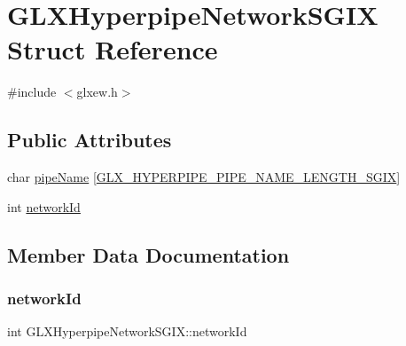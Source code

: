 \hypertarget{struct_g_l_x_hyperpipe_network_s_g_i_x}{}\section{G\+L\+X\+Hyperpipe\+Network\+S\+G\+IX Struct Reference}
\label{struct_g_l_x_hyperpipe_network_s_g_i_x}


{\ttfamily \#include $<$glxew.\+h$>$}

\subsection*{Public Attributes}
\begin{DoxyCompactItemize}
\item 
char \hyperlink{struct_g_l_x_hyperpipe_network_s_g_i_x_a6338b9717fa895aec16b932f2ef693ed}{pipe\+Name} \mbox{[}\hyperlink{glxew_8h_ae1c8261c0861010d8003a31d07e26005}{G\+L\+X\+\_\+\+H\+Y\+P\+E\+R\+P\+I\+P\+E\+\_\+\+P\+I\+P\+E\+\_\+\+N\+A\+M\+E\+\_\+\+L\+E\+N\+G\+T\+H\+\_\+\+S\+G\+IX}\mbox{]}
\item 
int \hyperlink{struct_g_l_x_hyperpipe_network_s_g_i_x_a81393053988b32fadb0b21615024add1}{network\+Id}
\end{DoxyCompactItemize}


\subsection{Member Data Documentation}
\mbox{\label{struct_g_l_x_hyperpipe_network_s_g_i_x_a81393053988b32fadb0b21615024add1}} 
\subsubsection{\texorpdfstring{network\+Id}{networkId}}
{\footnotesize\ttfamily int G\+L\+X\+Hyperpipe\+Network\+S\+G\+I\+X\+::network\+Id}

\mbox{\label{struct_g_l_x_hyperpipe_network_s_g_i_x_a6338b9717fa895aec16b932f2ef693ed}} 

